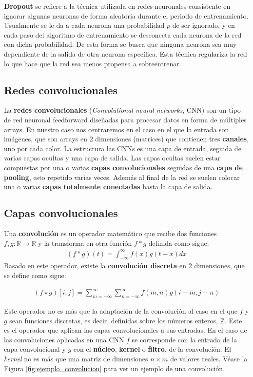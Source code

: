 \textbf{Dropout} \cite{hinton2012improving} se refiere a la técnica utilizada en redes neuronales consistente en ignorar algunas neuronas de forma aleatoria durante el periodo de entrenamiento. Usualmente se le da a cada neurona una probabilidad $p$ de ser ignorado, y en cada paso del algoritmo de entrenamiento se desconecta cada neurona de la red con dicha probabilidad. De esta forma se busca que ninguna neurona sea muy dependiente de la salida de otra neurona específica. Esta técnica regulariza la red lo que hace que la red sea menos propensa a sobreentrenar.

\subsection{Redes convolucionales}
La \textbf{redes convolucionales} (\textit{Convolutional neural networks}, CNN) \cite{9451544} son un tipo de red neuronal feedforward diseñadas para procesar datos en forma de múltiples arrays. En nuestro caso nos centraremos en el caso en el que la entrada son imágenes, que son arrays en 2 dimensiones (matrices) que contienen tres \textbf{canales}, uno por cada color.  La estructura las CNNs es una capa de entrada, seguida de varias capas ocultas y una capa de salida. Las capas ocultas suelen estar compuestas por una o varias \textbf{capas convolucionales} seguidas de una \textbf{capa de pooling}, esto repetido varias veces. Además al final de la red se suelen colocar una o varias \textbf{capas totalmente conectadas} hasta la capa de salida.

\subsection*{Capas convolucionales}
Una \textbf{convolución} es un operador matemático que recibe dos funciones $f,g:\mathbb{R}\rightarrow \mathbb{R}$ y la transforma en otra función $f\ast g$ definida como sigue:
\begin{align*}
(f \ast g)(t) = \int_{-\infty}^{\infty} f(x)g(t-x)dx
\end{align*}
Basado en este operador, existe la \textbf{convolución discreta} en 2 dimensiones, que se define como sigue:

\begin{align*}
(f\star g)[i,j] = \sum_{m=-\infty}^{\infty}\sum_{n=-\infty}^{\infty}f(m,n)g(i-m,j-n)
\end{align*}

Este operador no es más que la adaptación de la convolución al caso en el que $f$ y $g$ sean funciones discretas, es decir, definidas sobre los números enteros, $\mathbb{Z}$. Este es el operador que aplican las capas convolucionales a sus entradas. En el caso de las convoluciones aplicadas en una CNN $f$ se corresponde con la entrada de la capa convolucional y $g$ con el \textbf{núcleo}, \textbf{kernel} o \textbf{filtro}. de la convolución. El \textit{kernel} no es más que una matriz de dimensiones $n\times m$ de valores reales. Véase la Figura \ref{fig:ejemplo_convolucion} para ver un ejemplo de una convolución.

